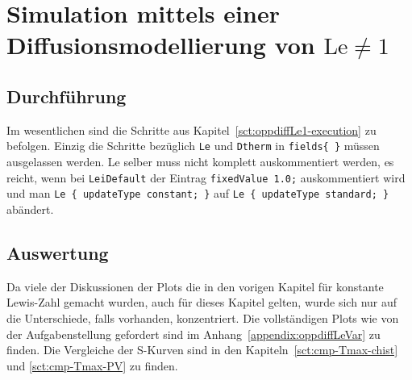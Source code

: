 
\section{Simulation mittels einer Diffusionsmodellierung von \texorpdfstring{$\mathrm{Le}\neq 1$}{Le!=1}}
\label{sct:oppdiffLevar}

\subsection{Durchführung}

Im wesentlichen sind die Schritte aus Kapitel~\ref{sct:oppdiffLe1-execution} zu befolgen.
Einzig die Schritte bezüglich \lstinline!Le! und \lstinline!Dtherm! in \lstinline!fields{ }! müssen ausgelassen werden. Le selber muss nicht komplett auskommentiert werden, es reicht, wenn bei \lstinline!LeiDefault! der Eintrag \lstinline!fixedValue 1.0;! auskommentiert wird und man \lstinline!Le { updateType constant; }! auf \lstinline!Le { updateType standard; }! abändert.

\subsection{Auswertung}
\label{sct:oppdiffLevar:note}

Da viele der Diskussionen der Plots die in den vorigen Kapitel für konstante Lewis-Zahl gemacht wurden, auch für dieses Kapitel gelten, wurde sich nur auf die Unterschiede, falls vorhanden, konzentriert. Die vollständigen Plots wie von der Aufgabenstellung gefordert sind im Anhang~\ref{appendix:oppdiffLeVar} zu finden. Die Vergleiche der S-Kurven sind in den Kapiteln~\ref{sct:cmp-Tmax-chist} und \ref{sct:cmp-Tmax-PV} zu finden.


